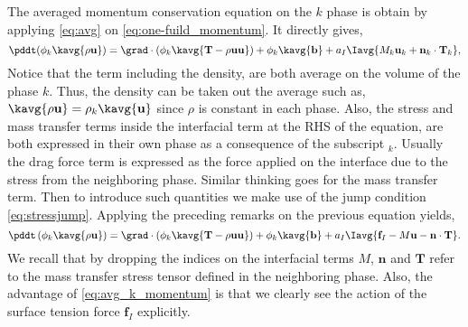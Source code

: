 The averaged momentum conservation equation on the $k$ phase is obtain by applying 
\ref{eq:avg} on \ref{eq:one-fuild_momentum}. 
It directly gives, 
\begin{equation}
    \pddt (\phi_k\kavg{\rho\textbf{u}}) 
    = \grad\cdot\left(
        \phi_k \kavg{\textbf{T}
        - \rho\textbf{uu}}
    \right)
    +\phi_k\kavg{\textbf{b}}
    + a_I\Iavg{M_k \textbf{u}_k +\textbf{n}_k\cdot\textbf{T}_k},
\end{equation}
Notice that the term including the density, are both average on the volume of the phase $k$.
Thus, the density can be taken out the average such as, $\kavg{\rho \textbf{u}} = \rho_k\kavg{\textbf{u}}$ since $\rho$ is constant in each phase. 
Also, the stress and mass transfer terms inside the interfacial term at the RHS of the equation, are both expressed in their own phase as a consequence of the subscript $_k$.
Usually the drag force term is expressed as the force applied on the interface due to the stress from the neighboring phase. 
Similar thinking goes for the mass transfer term. 
Then to introduce such quantities we make use of the jump condition \ref{eq:stressjump}. 
Applying the preceding remarks on the previous equation yields,
\begin{equation}
    \pddt \left(
        \phi_k\kavg{\rho\textbf{u}}
    \right)
    = \grad\cdot\left(
        \phi_k \kavg{
            \textbf{T}
            -\rho \textbf{uu}}
    \right)
    +\phi_k\kavg{\textbf{b}}
    + a_I\Iavg{
        \textbf{f}_I 
        - M \textbf{u} 
        - \textbf{n}\cdot\textbf{T}
    }.
    \label{eq:avg_k_momentum}
\end{equation}
We recall that by dropping the indices on the interfacial terms $M$, $\textbf{n}$ and $\textbf{T}$ refer to the mass transfer stress tensor defined in the neighboring phase. 
Also, the advantage of \ref{eq:avg_k_momentum} is that we clearly see the action of the surface tension force $\textbf{f}_I$ explicitly.

